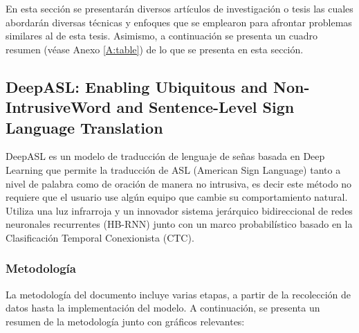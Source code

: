 En esta sección se presentarán diversos artículos de investigación o tesis las cuales abordarán diversas técnicas y enfoques que se emplearon para afrontar problemas similares al de esta tesis. Asimismo, a continuación se presenta un cuadro resumen (véase Anexo \ref{A:table}) de lo que se presenta en esta sección.


\subsection{DeepASL: Enabling Ubiquitous and Non-IntrusiveWord and Sentence-Level Sign Language Translation}

DeepASL es un modelo de traducción de lenguaje de señas basada en Deep Learning que permite la traducción de ASL (American Sign Language) tanto a nivel de palabra como de oración de manera no intrusiva, es decir  este método no requiere que el usuario use algún equipo que cambie su comportamiento natural. Utiliza una luz infrarroja y un innovador sistema jerárquico bidireccional de redes neuronales recurrentes (HB-RNN) junto con un marco probabilístico basado en la Clasificación Temporal Conexionista (CTC).

\subsubsection {Metodología}
La metodología del documento incluye varias etapas, a partir de la recolección de datos hasta la implementación del modelo. A continuación, se presenta un resumen de la metodología junto con gráficos relevantes:

